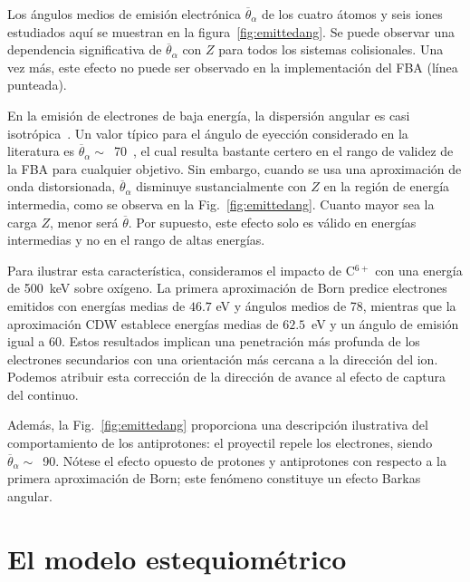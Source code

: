 Los ángulos medios de emisión electrónica $\overline{\theta}_{\alpha}$ 
de los cuatro átomos y seis iones estudiados aquí se muestran en la 
figura~\ref{fig:emittedang}. Se puede observar una dependencia 
significativa de $\overline{\theta}_{\alpha}$ con $Z$ para todos los 
sistemas colisionales. Una vez más, este efecto no puede ser observado en 
la implementación del FBA (línea punteada).

En la emisión de electrones de baja energía, la dispersión angular es 
casi isotrópica~\cite{Rudd1992}. Un valor típico para el ángulo de 
eyección considerado en la literatura es 
$\overline{\theta}_{\alpha}\sim$~70\textdegree~\cite{surdutovic2018}, el 
cual resulta bastante certero en el rango de validez de la FBA para 
cualquier objetivo. Sin embargo, cuando se usa una aproximación de onda 
distorsionada, $\overline{\theta}_{\alpha}$ disminuye sustancialmente con 
$Z$ en la región de energía intermedia, como se observa en la 
Fig.~\ref{fig:emittedang}. Cuanto mayor sea la carga $Z$, menor será 
$\overline{\theta}$. Por supuesto, este efecto solo es válido en energías 
intermedias y no en el rango de altas energías.

Para ilustrar esta característica, consideramos el impacto de C$^{6+}$ 
con una energía de 500~keV sobre oxígeno. La primera aproximación de Born 
predice electrones emitidos con energías medias de $46.7$ eV y ángulos 
medios de 78\textdegree, mientras que la aproximación CDW establece 
energías medias de $62.5$~eV y un ángulo de emisión igual a 60\textdegree. 
Estos resultados implican una penetración más profunda de los electrones 
secundarios con una orientación más cercana a la dirección del ion. 
Podemos atribuir esta corrección de la dirección de avance al efecto de 
captura del continuo.

Además, la Fig.~\ref{fig:emittedang} proporciona una descripción 
ilustrativa del comportamiento de los antiprotones: el proyectil repele 
los electrones, siendo $\overline{\theta}_{\alpha}\sim$~90\textdegree. 
Nótese el efecto opuesto de protones y antiprotones con respecto a la 
primera aproximación de Born; este fenómeno constituye un efecto Barkas 
angular.

\section{El modelo estequiométrico}
\label{sec:SSM}

